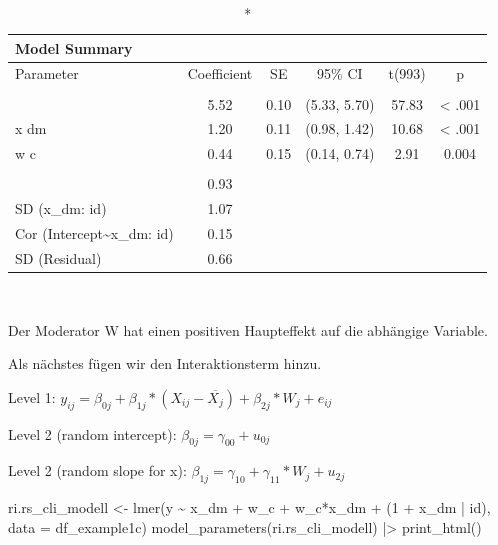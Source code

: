\documentclass[
  letterpaper,
  DIV=11,
  numbers=noendperiod]{scrreprt}
\newenvironment{Shaded}{\begin{snugshade}}{\end{snugshade}}
\newcommand{\AttributeTok}[1]{\textcolor[rgb]{0.40,0.45,0.13}{#1}}
\newcommand{\DecValTok}[1]{\textcolor[rgb]{0.68,0.00,0.00}{#1}}
\newcommand{\FunctionTok}[1]{\textcolor[rgb]{0.28,0.35,0.67}{#1}}
\newcommand{\NormalTok}[1]{\textcolor[rgb]{0.00,0.23,0.31}{#1}}
\newcommand{\OtherTok}[1]{\textcolor[rgb]{0.00,0.23,0.31}{#1}}
\newcommand{\SpecialCharTok}[1]{\textcolor[rgb]{0.37,0.37,0.37}{#1}}
\begin{document}
\begingroup
\fontsize{12.0pt}{14.4pt}\selectfont
\setlength{\LTpost}{0mm}
\begin{longtable*}{lccccc}
\caption*{
{\large Model Summary}
} \\ 
\toprule
Parameter & Coefficient & SE & 95\% CI & t(993) & p \\ 
\midrule\addlinespace[2.5pt]
 \\[2.5pt] 
\midrule{} & 5.52 & 0.10 & (5.33, 5.70) & 57.83 & < .001 \\ 
{x dm} & 1.20 & 0.11 & (0.98, 1.42) & 10.68 & < .001 \\ 
{w c} & 0.44 & 0.15 & (0.14, 0.74) & 2.91 & 0.004  \\ 
\midrule\addlinespace[2.5pt]
 \\[2.5pt] 
\midrule{} & 0.93 &  &  &  &  \\ 
{SD (x\_dm: id)} & 1.07 &  &  &  &  \\ 
{Cor (Intercept\textasciitilde{}x\_dm: id)} & 0.15 &  &  &  &  \\ 
{SD (Residual)} & 0.66 &  &  &  &  \\ 
\bottomrule
\end{longtable*}
\begin{minipage}{\linewidth}
\\
\end{minipage}
\endgroup

Der Moderator W hat einen positiven Haupteffekt auf die abhängige
Variable.

Als nächstes fügen wir den Interaktionsterm hinzu.

Level 1:
\(y_{ij} = \beta_{0j} + \beta_{1j}*(X_{ij}-\overline{X_j}) + \beta_{2j}*W_{j} + e_{ij}\)

Level 2 (random intercept): \(\beta_{0j} = \gamma_{00} + u_{0j}\)

Level 2 (random slope for x):
\(\beta_{1j} = \gamma_{10} + \gamma_{11}*W_{j} + u_{2j}\)

\begin{Shaded}
\begin{Highlighting}[]
\NormalTok{ri.rs\_cli\_modell }\OtherTok{\textless{}{-}} \FunctionTok{lmer}\NormalTok{(y }\SpecialCharTok{\textasciitilde{}}\NormalTok{ x\_dm }\SpecialCharTok{+}\NormalTok{ w\_c }\SpecialCharTok{+}\NormalTok{ w\_c}\SpecialCharTok{*}\NormalTok{x\_dm }\SpecialCharTok{+}\NormalTok{ (}\DecValTok{1} \SpecialCharTok{+}\NormalTok{ x\_dm }\SpecialCharTok{|}\NormalTok{ id), }\AttributeTok{data =}\NormalTok{ df\_example1c)}
\FunctionTok{model\_parameters}\NormalTok{(ri.rs\_cli\_modell) }\SpecialCharTok{|\textgreater{}} \FunctionTok{print\_html}\NormalTok{()}
\end{Highlighting}
\end{Shaded}
\end{document}
